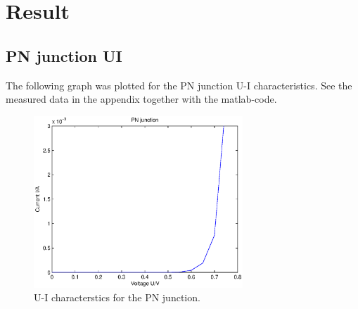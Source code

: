 \documentclass[a4paper]{article}
\begin{document}
\section{Result}
\subsection{PN junction UI}
The following graph was plotted for the PN junction U-I characteristics. See the measured data in the appendix together with the matlab-code. 
\begin{figure}[H]
	\centering
	\includegraphics[width=0.7\textwidth]{pn_ui.eps}
	\caption{U-I characterstics for the PN junction.}
	\label{pn_ui}
\end{figure}
\end{document}
